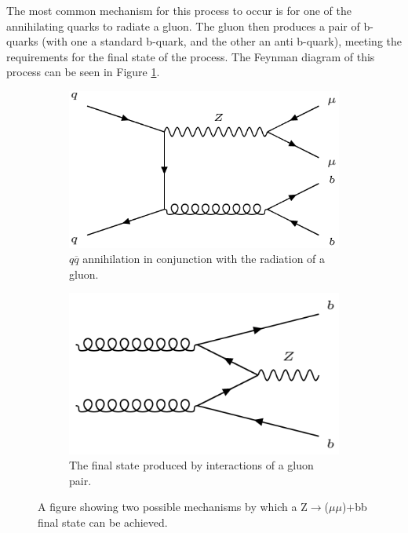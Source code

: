 \documentclass[12pt,a4paper,epsf,portrait,times,epsfig]{report}
\begin{document}
		The most common mechanism for this process to occur is for one of the annihilating quarks to radiate a gluon. The gluon then produces a pair of b-quarks (with one a standard b-quark, and the other an anti b-quark), meeting the requirements for the final state of the process. The Feynman diagram of this process can be seen in Figure \ref{Fig:SFigAnnihilationFeynman}. \par
		
		
		\begin{figure}[h!]
			\begin{subfigure}{.45\textwidth}
				\centering
				\includegraphics[scale=0.5]{Zbb_2.png}
				\caption{$q\overline{q}$ annihilation in conjunction with \newline the radiation of a gluon.}
				\label{Fig:SFigAnnihilationFeynman}
			\end{subfigure}
			\begin{subfigure}{.45\textwidth}
				\centering
				\includegraphics[scale=0.42]{Gluon_Pair.png}
				\caption{The final state produced by interactions \newline of a gluon pair.}
				\label{Fig:SFigGluonPairFeynman}
			\end{subfigure}
			\caption{A figure showing two possible mechanisms by which a Z$\rightarrow$($\mu\mu$)+bb final state can be achieved. }
			\label{Fig:FeynmanProcesses}
		\end{figure}
		
\end{document}

